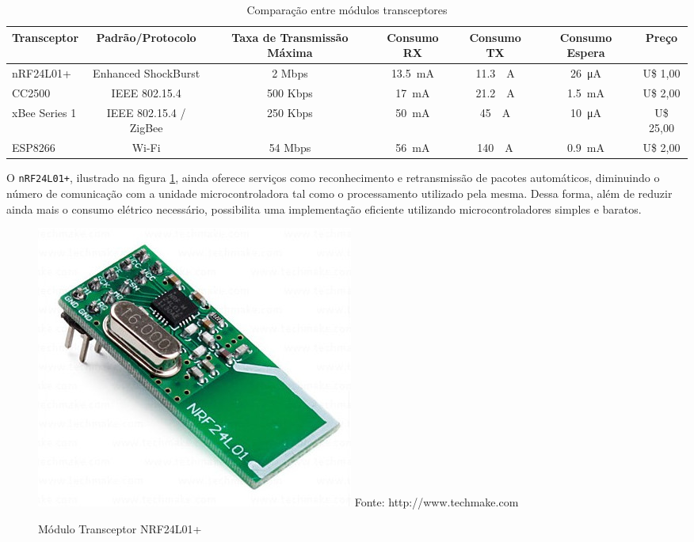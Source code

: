 \begin{table}[H]
	\centering
	\resizebox{\textwidth}{!} {
		\begin{tabular}{|l|c|c|c|c|c|c|}
		\hline
		Transceptor   & Padrão/Protocolo       & Taxa de Transmissão Máxima & Consumo RX & Consumo TX &
		Consumo Espera & Preço     \\ \hline \hline
		nRF24L01+     & Enhanced ShockBurst    & 2 Mbps   & \SI{13.5}{\milli \ampere} & \SI{11.3}{\milli
		\ampere} & \SI{26}{\micro \ampere} & U\$ 1,00  \\ \hline
		CC2500        & IEEE 802.15.4          & 500 Kbps & \SI{17}{\milli \ampere}   & \SI{21.2} {\milli
		\ampere}  & \SI{1.5}{\milli \ampere} & U\$ 2,00  \\ \hline
		xBee Series 1 & IEEE 802.15.4 / ZigBee & 250 Kbps & \SI{50}{\milli \ampere}   & \SI{45}{\milli
		\ampere} & \SI{10}{\micro \ampere}  & U\$ 25,00 \\ \hline
		ESP8266       & Wi-Fi                  & 54 Mbps  & \SI{56}{\milli \ampere}   & \SI{140}{\milli
		\ampere} & \SI{0.9}{\milli \ampere}& U\$ 2,00  \\ \hline
		\end{tabular}
	}
	\caption{Comparação entre módulos transceptores}
	\label{quadro:transceivers}
\end{table}

O \texttt{nRF24L01+}, ilustrado na figura \ref{figura:nrf}, ainda oferece serviços como reconhecimento e
retransmissão de pacotes automáticos, diminuindo o número de comunicação com a unidade microcontroladora tal
como o processamento utilizado pela mesma. Dessa forma, além de reduzir ainda mais o consumo elétrico
necessário, possibilita uma implementação eficiente utilizando microcontroladores simples e baratos.

\begin{figure}[h]
	\caption{Módulo Transceptor NRF24L01+}
	\centering
	\includegraphics[scale=0.25]{../images/nrf.jpg}
	\hspace{\linewidth}
	Fonte: http://www.techmake.com
	\label{figura:nrf}
\end{figure}


